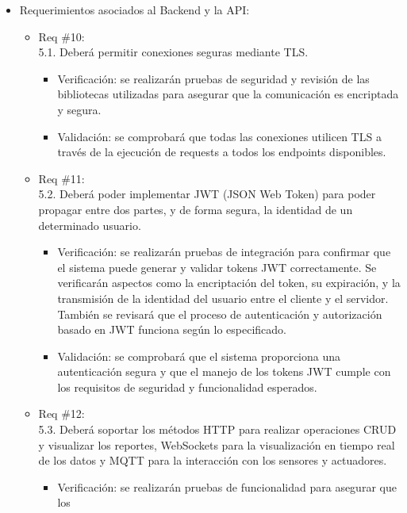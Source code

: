 \begin{itemize}
	\item Requerimientos asociados al Backend y la API:
	      \begin{itemize}
		      \item Req \#10:\\ 5.1. Deberá permitir conexiones seguras mediante TLS.
		            \begin{itemize}
			            \item Verificación: se realizarán pruebas de seguridad y revisión de las bibliotecas
			                  utilizadas para asegurar que la comunicación es encriptada y segura.
			            \item Validación: se comprobará que todas las conexiones utilicen TLS a través de la
			                  ejecución de requests a todos los endpoints disponibles.
		            \end{itemize}
		      \item Req \#11: \\ 5.2. Deberá poder implementar JWT (JSON Web Token) para poder
		            propagar entre dos partes, y de forma segura, la identidad de un determinado
		            usuario.
		            \begin{itemize}
			            \item Verificación: se realizarán pruebas de integración para confirmar que el
			                  sistema puede generar y validar tokens JWT correctamente. Se verificarán
			                  aspectos como la encriptación del token, su expiración, y la transmisión de la
			                  identidad del usuario entre el cliente y el servidor. También se revisará que
			                  el proceso de autenticación y autorización basado en JWT funciona según lo
			                  especificado.
			            \item Validación: se comprobará que el sistema proporciona una autenticación segura y
			                  que el manejo de los tokens JWT cumple con los requisitos de seguridad y
			                  funcionalidad esperados.
		            \end{itemize}
		      \item Req \#12: \\ 5.3. Deberá soportar los métodos HTTP para realizar operaciones
		            CRUD y visualizar los reportes, WebSockets para la visualización en tiempo real
		            de los datos y MQTT para la interacción con los sensores y actuadores.
		            \begin{itemize}
			            \item Verificación: se realizarán pruebas de funcionalidad para asegurar que los

\end{itemize}
\end{itemize}
\end{itemize}
